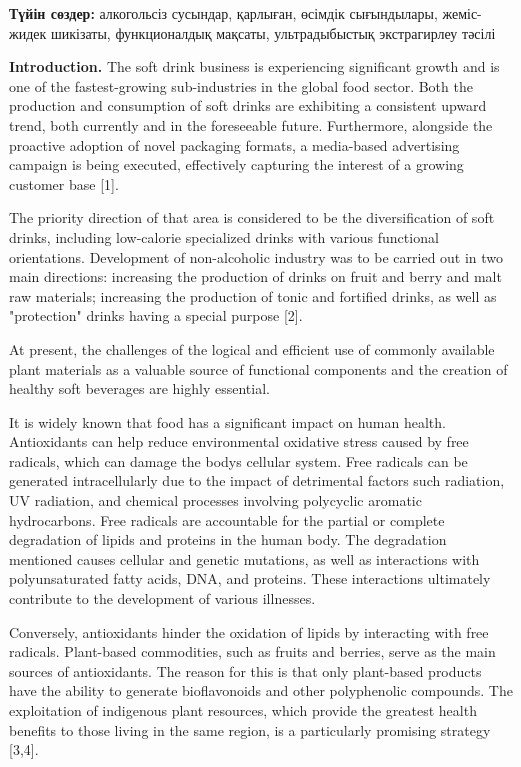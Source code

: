 {\bfseries Түйін сөздер:} алкогольсіз сусындар, қарлыған, өсімдік
сығындылары, жеміс-жидек шикізаты, функционалдық мақсаты, ультрадыбыстық
экстрагирлеу тәсілі
\begin{multicols}{2}

{\bfseries Introduction.} The soft drink business is experiencing
significant growth and is one of the fastest-growing sub-industries in
the global food sector. Both the production and consumption of soft
drinks are exhibiting a consistent upward trend, both currently and in
the foreseeable future. Furthermore, alongside the proactive adoption of
novel packaging formats, a media-based advertising campaign is being
executed, effectively capturing the interest of a growing customer base
{[}1{]}.

The priority direction of that area is considered to be the
diversification of soft drinks, including low-calorie specialized drinks
with various functional orientations. Development of non-alcoholic
industry was to be carried out in two main directions: increasing the
production of drinks on fruit and berry and malt raw materials;
increasing the production of tonic and fortified drinks, as well as
"protection" drinks having a special purpose {[}2{]}.

At present, the challenges of the logical and efficient use of commonly
available plant materials as a valuable source of functional components
and the creation of healthy soft beverages are highly essential.

It is widely known that food has a significant impact on human health.
Antioxidants can help reduce environmental oxidative stress caused by
free radicals, which can damage the body\textquotesingle s cellular
system. Free radicals can be generated intracellularly due to the impact
of detrimental factors such radiation, UV radiation, and chemical
processes involving polycyclic aromatic hydrocarbons. Free radicals are
accountable for the partial or complete degradation of lipids and
proteins in the human body. The degradation mentioned causes cellular
and genetic mutations, as well as interactions with polyunsaturated
fatty acids, DNA, and proteins. These interactions ultimately contribute
to the development of various illnesses.

Conversely, antioxidants hinder the oxidation of lipids by interacting
with free radicals. Plant-based commodities, such as fruits and berries,
serve as the main sources of antioxidants. The reason for this is that
only plant-based products have the ability to generate bioflavonoids and
other polyphenolic compounds. The exploitation of indigenous plant
resources, which provide the greatest health benefits to those living in
the same region, is a particularly promising strategy {[}3,4{]}.


\end{multicols}
